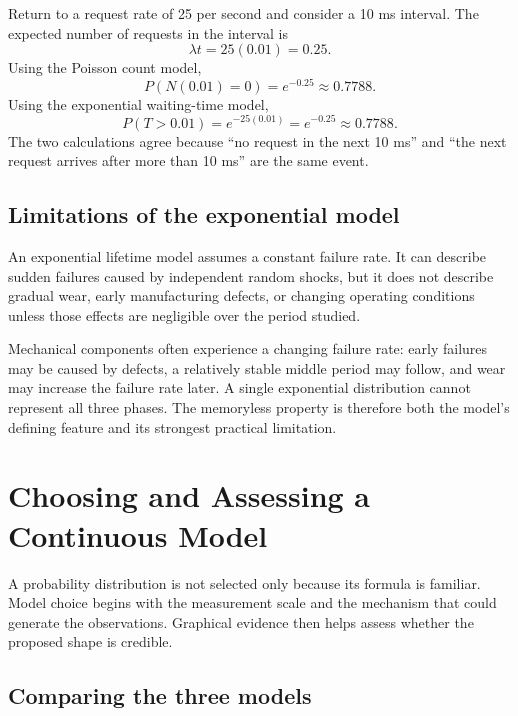 \begin{example}\par
Return to a request rate of 25 per second and consider a 10 ms interval. The expected number of requests in the interval is
\[
    \lambda t=25(0.01)=0.25.
\]
Using the Poisson count model,
\[
    P(N(0.01)=0)=e^{-0.25}\approx0.7788.
\]
Using the exponential waiting-time model,
\[
    P(T>0.01)=e^{-25(0.01)}=e^{-0.25}\approx0.7788.
\]
The two calculations agree because ``no request in the next 10 ms'' and ``the next request arrives after more than 10 ms'' are the same event.
\end{example}

\subsection{Limitations of the exponential model}

An exponential lifetime model assumes a constant failure rate. It can describe sudden failures caused by independent random shocks, but it does not describe gradual wear, early manufacturing defects, or changing operating conditions unless those effects are negligible over the period studied.

Mechanical components often experience a changing failure rate: early failures may be caused by defects, a relatively stable middle period may follow, and wear may increase the failure rate later. A single exponential distribution cannot represent all three phases. The memoryless property is therefore both the model's defining feature and its strongest practical limitation.

\section{Choosing and Assessing a Continuous Model}
\label{sec:model-assessment-continuous}

A probability distribution is not selected only because its formula is familiar. Model choice begins with the measurement scale and the mechanism that could generate the observations. Graphical evidence then helps assess whether the proposed shape is credible.

\subsection{Comparing the three models}

